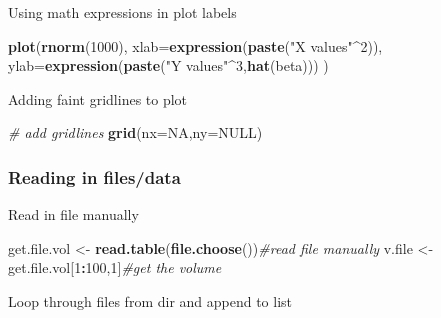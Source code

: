 \documentclass[10,portrait]{article}
\newenvironment{Shaded}{\begin{snugshade}}{\end{snugshade}}
\newcommand{\KeywordTok}[1]{\textcolor[rgb]{0.13,0.29,0.53}{\textbf{#1}}}
\newcommand{\DataTypeTok}[1]{\textcolor[rgb]{0.13,0.29,0.53}{#1}}
\newcommand{\DecValTok}[1]{\textcolor[rgb]{0.00,0.00,0.81}{#1}}
\newcommand{\StringTok}[1]{\textcolor[rgb]{0.31,0.60,0.02}{#1}}
\newcommand{\CommentTok}[1]{\textcolor[rgb]{0.56,0.35,0.01}{\textit{#1}}}
\newcommand{\OtherTok}[1]{\textcolor[rgb]{0.56,0.35,0.01}{#1}}
\newcommand{\OperatorTok}[1]{\textcolor[rgb]{0.81,0.36,0.00}{\textbf{#1}}}
\newcommand{\NormalTok}[1]{#1}
\begin{document}
Using math expressions in plot labels

\begin{Shaded}
\begin{Highlighting}[]
\KeywordTok{plot}\NormalTok{(}\KeywordTok{rnorm}\NormalTok{(}\DecValTok{1000}\NormalTok{),}
     \DataTypeTok{xlab=}\KeywordTok{expression}\NormalTok{(}\KeywordTok{paste}\NormalTok{(}\StringTok{"X values"}\OperatorTok{^}\DecValTok{2}\NormalTok{)),}
     \DataTypeTok{ylab=}\KeywordTok{expression}\NormalTok{(}\KeywordTok{paste}\NormalTok{(}\StringTok{"Y values"}\OperatorTok{^}\DecValTok{3}\NormalTok{,}\KeywordTok{hat}\NormalTok{(beta)))}
\NormalTok{)}
\end{Highlighting}
\end{Shaded}

Adding faint gridlines to plot

\begin{Shaded}
\begin{Highlighting}[]
\CommentTok{# add gridlines}
\KeywordTok{grid}\NormalTok{(}\DataTypeTok{nx=}\OtherTok{NA}\NormalTok{,}\DataTypeTok{ny=}\OtherTok{NULL}\NormalTok{)}
\end{Highlighting}
\end{Shaded}

\subsubsection{Reading in files/data}\label{reading-in-filesdata}

Read in file manually

\begin{Shaded}
\begin{Highlighting}[]
\NormalTok{get.file.vol <-}\StringTok{ }\KeywordTok{read.table}\NormalTok{(}\KeywordTok{file.choose}\NormalTok{())}\CommentTok{#read file manually}
\NormalTok{v.file <-}\StringTok{ }\NormalTok{get.file.vol[}\DecValTok{1}\OperatorTok{:}\DecValTok{100}\NormalTok{,}\DecValTok{1}\NormalTok{]}\CommentTok{#get the volume}
\end{Highlighting}
\end{Shaded}

Loop through files from dir and append to list
\end{document}
